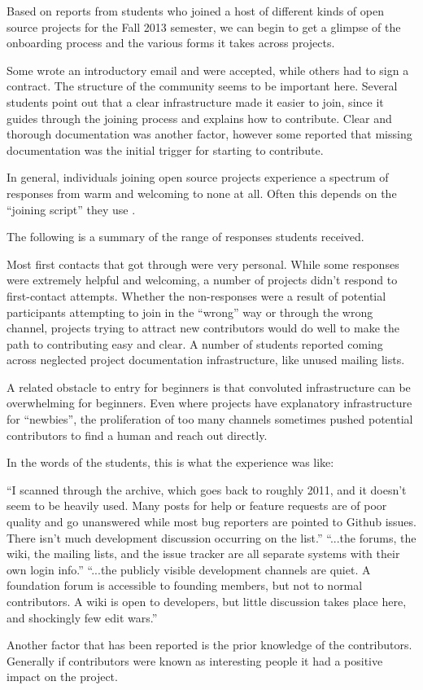 Based on reports from students who joined a host of different kinds of open source projects for the Fall 2013 semester, we can begin to get a glimpse of the onboarding process and the various forms it takes across projects. 

Some wrote an introductory email and were accepted, while others had to sign a contract. The structure of the community seems to be important here. Several students point out that a clear infrastructure made it easier to join, since it guides through the joining process and explains how to contribute. Clear and thorough documentation was another factor, however some reported that missing documentation was the initial trigger for starting to contribute.

In general, individuals joining open source projects experience a spectrum of responses from warm and welcoming to none at all. Often this depends on the “joining script” they use \cite{vonKrogh2013}. 

The following is a summary of the range of responses students received. 

Most first contacts that got through were very personal. While some responses were extremely helpful and welcoming, a number of projects didn’t respond to first-contact attempts. Whether the non-responses were a result of potential participants attempting to join in the ``wrong'' way or through the wrong channel, projects trying to attract new contributors would do well to make the path to contributing easy and clear. A number of students reported coming across neglected project documentation infrastructure, like unused mailing lists. 

A related obstacle to entry for beginners is that convoluted infrastructure can be overwhelming for beginners. Even where projects have explanatory infrastructure for ``newbies'', the proliferation of too many channels sometimes pushed potential contributors to find a human and reach out directly. 

In the words of the students, this is what the experience was like:

``I scanned through the archive, which goes back to roughly 2011, and it doesn’t seem to be heavily used. Many posts for help or feature requests are of poor quality and go unanswered while most bug reporters are pointed to Github issues. There isn’t much development discussion occurring on the list.'' 
``...the forums, the wiki, the mailing lists, and the issue tracker are all separate systems with their own login info.''
``...the publicly visible development channels are quiet. A foundation forum is accessible to founding members, but not to normal contributors. A wiki is open to developers, but little discussion takes place here, and shockingly few edit wars.''

Another factor that has been reported is the prior knowledge of the contributors. Generally if contributors were known as interesting people it had a positive impact on the project.
